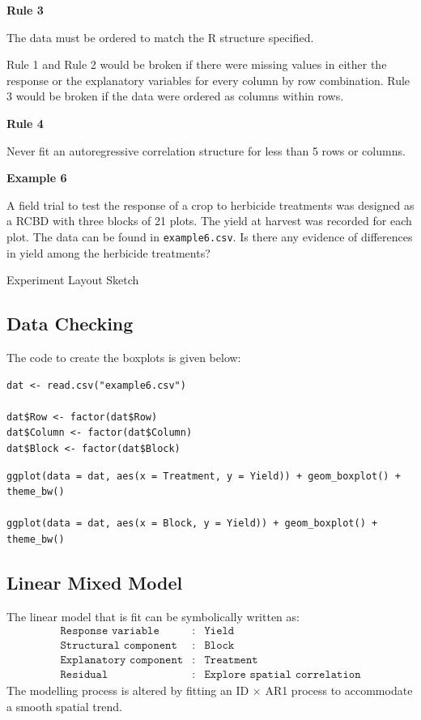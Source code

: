 \documentclass[a4paper, 10pt, fleqn, twosided]{memoir}
\begin{document}
\textbf{Rule 3}

The data must be ordered to match the R structure specified.



Rule 1 and Rule 2 would be broken if there were missing values in either the response or the explanatory variables for
every column by row combination. Rule 3 would be broken if the data were ordered as columns within rows.

\textbf{Rule 4}

Never fit an autoregressive correlation structure for less than 5 rows or
columns.

\textbf{Example 6}

A field trial to test the response of a crop to herbicide treatments was
designed as a RCBD with three blocks of 21 plots. The yield at harvest was
recorded for each plot.  The data can be found in \texttt{example6.csv}. Is
there any evidence of differences in yield among the herbicide treatments?


\begin{application}{Experiment Layout Sketch}
\vspace{10cm}
\end{application}


\subsection{Data Checking}

The code to create the boxplots is given below:

\begin{tcolorbox}[title = Import and graph the data]
\begin{verbatim}
dat <- read.csv("example6.csv")

dat$Row <- factor(dat$Row)
dat$Column <- factor(dat$Column)
dat$Block <- factor(dat$Block)
\end{verbatim}
\tcblower
\begin{verbatim}
ggplot(data = dat, aes(x = Treatment, y = Yield)) + geom_boxplot() +
theme_bw()

ggplot(data = dat, aes(x = Block, y = Yield)) + geom_boxplot() +
theme_bw()
\end{verbatim}
\end{tcolorbox}


\subsection{Linear Mixed Model}
The linear model that is fit can be symbolically written as:
\begin{eqnarray*}
	\texttt{Response variable}&:& \texttt{Yield} \\
	\texttt{Structural component}&:& \texttt{Block}\\
	\texttt{Explanatory component}&:& \texttt{Treatment}\\
	\texttt{Residual}&:& \texttt{Explore spatial correlation}
\end{eqnarray*}
The modelling process is altered by fitting an ID $\times$ AR1 process to accommodate a smooth spatial trend.
\end{document}
